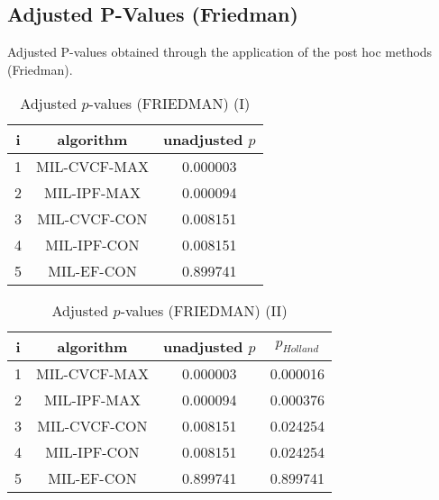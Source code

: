 \documentclass[a4paper,10pt]{article}
\begin{document}
\begin{landscape}
\newpage

\section{Adjusted P-Values (Friedman)}


Adjusted P-values obtained through the application of the post hoc methods (Friedman).

\begin{table}[!htp]
\centering\small
\begin{tabular}{ccc}
i&algorithm&unadjusted $p$\\
\hline1&MIL-CVCF-MAX&0.000003\\2&MIL-IPF-MAX&0.000094\\3&MIL-CVCF-CON&0.008151\\4&MIL-IPF-CON&0.008151\\5&MIL-EF-CON&0.899741\\\hline
\end{tabular}
\caption{Adjusted $p$-values (FRIEDMAN) (I)}
\end{table}
\begin{table}[!htp]
\centering\small
\begin{tabular}{cccc}
i&algorithm&unadjusted $p$&$p_{Holland}$\\
\hline1&MIL-CVCF-MAX&0.000003&0.000016\\2&MIL-IPF-MAX&0.000094&0.000376\\3&MIL-CVCF-CON&0.008151&0.024254\\4&MIL-IPF-CON&0.008151&0.024254\\5&MIL-EF-CON&0.899741&0.899741\\\hline
\end{tabular}
\caption{Adjusted $p$-values (FRIEDMAN) (II)}
\end{table}

\newpage
\end{landscape}
\end{document}
